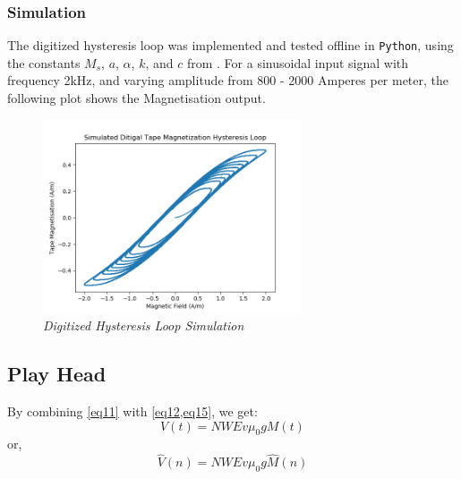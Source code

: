 \documentclass[twoside,a4paper]{article}
\begin{document}
\subsubsection{Simulation}
The digitized hysteresis loop was implemented and tested offline
in \texttt{Python}, using the constants $M_s$, $a$, $\alpha$, $k$,
and $c$ from \cite{JilesAtherton1986}. For a sinusoidal input signal
with frequency 2kHz, and varying amplitude from 800 - 2000 Amperes per
meter, the following plot shows the Magnetisation output.

\begin{figure}[ht]
    \center
    \includegraphics[width=3in]{../Simulations/Hysteresis/Sim2-M_H.png}
    \caption{\label{HysteresisSim}{\it Digitized Hysteresis Loop Simulation}}
\end{figure}
%
\subsection{Play Head}
By combining \cref{eq11} with \cref{eq12,eq15}, we get:
\begin{equation}
    V(t) =  NWEv \mu_0  g M(t)
\end{equation}
%
or,
\begin{equation}
    \hat{V}(n) =  NWEv \mu_0  g \hat{M}(n)
    \label{eq:Vout}
\end{equation}
%
\end{document}
